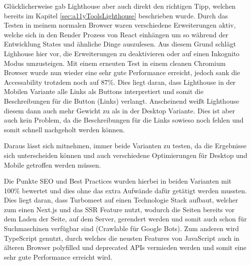 Glücklicherweise gab Lighthouse aber auch direkt den richtigen Tipp, welchen bereits im Kapitel \ref{sec:a11yToolsLighthouse} beschrieben wurde. Durch das Testen in meinem normalen Browser waren verschiedene Erweiterungen aktiv, welche sich in den Render Prozess von React einhängen um so während der Entwicklung States und ähnliche Dinge auszulesen. Aus diesem Grund schlägt Lighhouse hier vor, die Erweiterungen zu deaktivieren oder auf einen Inkognito Modus umzusteigen. Mit einem erneuten Test in einem cleanen Chromium Browser wurde nun wieder eine sehr gute Performance erreicht, jedoch sank die Accessability trotzdem noch auf 87\%. Dies liegt daran, dass Lighthouse in der Mobilen Variante alle Links als Buttons interpretiert und somit die Beschreibungen für die Button (Links) verlangt. Anscheinend weißt Lighthouse diesem dann auch mehr Gewicht zu als in der Desktop Variante. Dies ist aber auch kein Problem, da die Beschreibungen für die Links sowieso noch fehlen und somit schnell nachgeholt werden können.

Daraus lässt sich mitnehmen, immer beide Varianten zu testen, da die Ergebnisse sich unterscheiden können und auch verschiedene Optimierungen für Desktop und Mobile getroffen werden müssen. 

Die Punkte SEO und Best Practices wurden hierbei in beiden Varianten mit 100\% bewertet und dies ohne das extra Aufwände dafür getätigt werden mussten. Dies liegt daran, dass Turbomeet auf einen Technologie Stack aufbaut, welcher zum einen Next.js und das SSR Feature nutzt, wodurch die Seiten bereits vor dem Laden der Seite, auf dem Server, gerendert werden und somit auch schon für Suchmaschinen verfügbar sind (Crawlable für Google Bots). Zum anderen wird TypeScript genutzt, durch welches die neusten Features von JavaScript auch in älteren Browser polyfilled und deprecated APIs vermieden werden und somit eine sehr gute Performance erreicht wird.